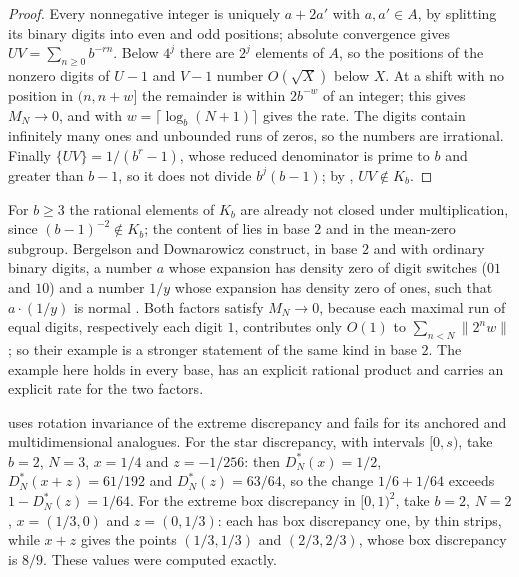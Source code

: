 \documentclass[11pt]{article}
\newcommand{\dist}[1]{\lVert #1\rVert}
\newcommand{\fr}[1]{\{#1\}}
\begin{document}
\begin{proof}
Every nonnegative integer is uniquely $a+2a'$ with $a,a'\in A$, by splitting its binary digits into even
and odd positions; absolute convergence gives $UV=\sum_{n\ge0}b^{-rn}$. Below $4^j$ there are $2^j$
elements of $A$, so the positions of the nonzero digits of $U-1$ and $V-1$ number $O(\sqrt X)$ below
$X$.
At a shift with no position in $(n,n+w]$ the remainder is within $2b^{-w}$ of an integer; this gives
$M_N\to0$, and  with $w=\lceil\log_b(N+1)\rceil$ gives the rate. The digits contain
infinitely many ones and unbounded runs of zeros, so the numbers are irrational. Finally
$\fr{UV}=1/(b^r-1)$, whose reduced denominator is prime to $b$ and greater than $b-1$, so it does not
divide $b^j(b-1)$; by , $UV\notin K_b$.
\end{proof}

For $b\ge3$ the rational elements of $K_b$ are already not closed under multiplication, since
$(b-1)^{-2}\notin K_b$; the content of  lies in base $2$ and in the mean-zero
subgroup. Bergelson and Downarowicz construct, in base $2$ and with ordinary binary digits, a number $a$ whose
expansion has density zero of digit switches ($01$ and $10$) and a number $1/y$ whose expansion has
density zero of ones, such that $a\cdot(1/y)$ is normal
\cite[Theorem~8.11, Proposition~8.13 and Corollary~8.14]{BD25}. Both factors satisfy $M_N\to0$, because
each maximal run of equal digits, respectively each digit $1$, contributes only $O(1)$ to
$\sum_{n<N}\dist{2^nw}$; so their example is a stronger statement of the same kind in base $2$. The
example here holds in every base, has an explicit rational product and carries an explicit rate for the
two factors.

\begin{remark}\label{rem:scope}
 uses rotation invariance of the extreme discrepancy and fails for its anchored and
multidimensional analogues. For the star discrepancy, with intervals $[0,s)$, take $b=2$, $N=3$,
$x=1/4$ and $z=-1/256$: then $D_N^*(x)=1/2$, $D_N^*(x+z)=61/192$ and $D_N^*(z)=63/64$, so the change
$1/6+1/64$ exceeds $1-D_N^*(z)=1/64$. For the extreme box discrepancy in $[0,1)^2$, take $b=2$, $N=2$,
$x=(1/3,0)$ and $z=(0,1/3)$: each has box discrepancy one, by thin strips, while $x+z$ gives the points
$(1/3,1/3)$ and $(2/3,2/3)$, whose box discrepancy is $8/9$. These values were computed exactly.
\end{remark}
\end{document}
